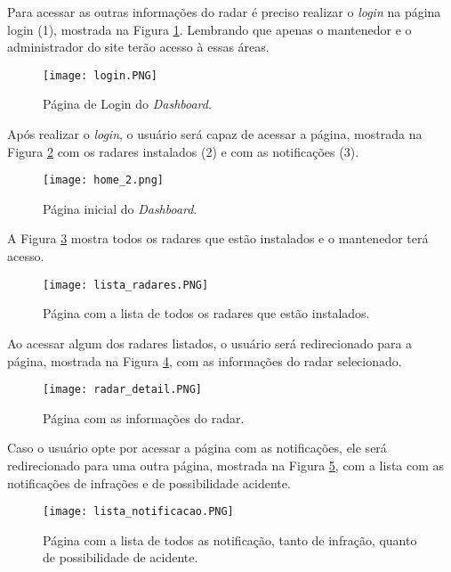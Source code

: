 Para acessar as outras informações do radar é preciso realizar o \textit{login} na página login (1), mostrada na Figura \ref{login}. Lembrando que apenas o mantenedor e o administrador do site terão acesso à essas áreas. 

  \begin{figure}[H]
     \centering
     \texttt{[image: login.PNG]}
     \caption{Página de Login do \textit{Dashboard}.}
     \label{login}
 \end{figure}
 
 Após realizar o \textit{login}, o usuário será capaz de acessar a página, mostrada na Figura \ref{home_2} com os radares instalados (2) e com as notificações (3).
 
   \begin{figure}[H]
     \centering
     \texttt{[image: home\_2.png]}
     \caption{Página inicial do \textit{Dashboard}.}
     \label{home_2}
 \end{figure}

A Figura \ref{radares} mostra todos os radares que estão instalados e o mantenedor terá acesso.

   \begin{figure}[H]
     \centering
     \texttt{[image: lista\_radares.PNG]}
     \caption{Página com a lista de todos os radares que estão instalados.}
     \label{radares}
 \end{figure}
 
 Ao acessar algum dos radares listados, o usuário será redirecionado para a página, mostrada na Figura \ref{radar_detail}, com as informações do radar selecionado.
 
    \begin{figure}[H]
     \centering
     \texttt{[image: radar\_detail.PNG]}
     \caption{Página com as informações do radar.}
     \label{radar_detail}
 \end{figure}

Caso o usuário opte por acessar a página com as notificações, ele será redirecionado para uma outra página, mostrada na Figura \ref{lista_notificacao}, com a lista com as notificações de infrações e de possibilidade acidente.

    \begin{figure}[H]
     \centering
     \texttt{[image: lista\_notificacao.PNG]}
     \caption{Página com a lista de todos as notificação, tanto de infração, quanto de possibilidade de acidente.}
     \label{lista_notificacao}
 \end{figure}
 
